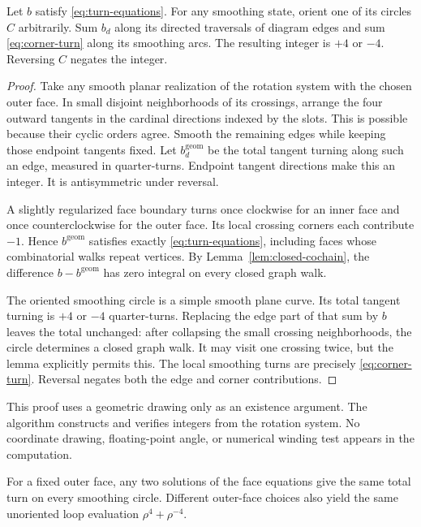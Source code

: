 \begin{theorem}
\label{thm:turning}
Let $b$ satisfy \eqref{eq:turn-equations}. For any smoothing state, orient
one of its circles $C$ arbitrarily. Sum $b_d$ along its directed traversals
of diagram edges and sum \eqref{eq:corner-turn} along its smoothing arcs.
The resulting integer is $+4$ or $-4$. Reversing $C$ negates the integer.
\end{theorem}

\begin{proof}
Take any smooth planar realization of the rotation system with the chosen
outer face. In small disjoint neighborhoods of its crossings, arrange
the four outward tangents in the cardinal directions indexed by the
slots. This is possible because their cyclic orders agree. Smooth the
remaining edges while keeping those endpoint tangents fixed.
Let $b^{\mathrm{geom}}_d$ be the total tangent turning along such an edge,
measured in quarter-turns. Endpoint tangent directions make this an integer.
It is antisymmetric under reversal.

A slightly regularized face boundary turns once clockwise for an inner
face and once counterclockwise for the outer face. Its local crossing
corners each contribute $-1$. Hence $b^{\mathrm{geom}}$ satisfies exactly
\eqref{eq:turn-equations}, including faces whose combinatorial walks
repeat vertices. By Lemma~\ref{lem:closed-cochain}, the difference
$b-b^{\mathrm{geom}}$ has zero integral on every closed graph walk.

The oriented smoothing circle is a simple smooth plane curve. Its total
tangent turning is $+4$ or $-4$ quarter-turns. Replacing the edge part of
that sum by $b$ leaves the total unchanged: after collapsing the small
crossing neighborhoods, the circle determines a closed graph walk.
It may visit one crossing twice, but the lemma explicitly permits this.
The local smoothing turns are precisely \eqref{eq:corner-turn}.
Reversal negates both the edge and corner contributions.
\end{proof}

This proof uses a geometric drawing only as an existence argument. The
algorithm constructs and verifies integers from the rotation system.
No coordinate drawing, floating-point angle, or numerical winding test
appears in the computation.

\begin{corollary}
\label{cor:gauge}
For a fixed outer face, any two solutions of the face equations give the
same total turn on every smoothing circle. Different outer-face choices
also yield the same unoriented loop evaluation $\rho^4+\rho^{-4}$.
\end{corollary}

